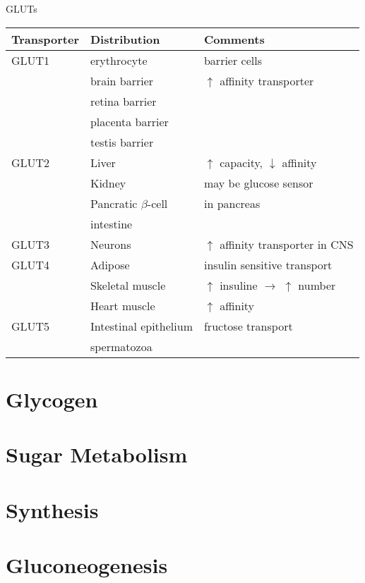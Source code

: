 \documentclass[presentation, smaller]{beamer}
\begin{document}
\begin{frame}[label={sec:orgdf508cc}]{GLUTs}
\begin{center}
\begin{tabular}{lll}
Transporter & Distribution & Comments\\
\hline
GLUT1 & erythrocyte & barrier cells\\
 & brain barrier & \(\uparrow\) affinity transporter\\
 & retina barrier & \\
 & placenta barrier & \\
 & testis barrier & \\
\hline
GLUT2 & Liver & \(\uparrow\) capacity, \(\downarrow\) affinity\\
 & Kidney & may be glucose sensor\\
 & Pancratic \(\beta\)-cell & in pancreas\\
 & intestine & \\
\hline
GLUT3 & Neurons & \(\uparrow\) affinity  transporter in CNS\\
\hline
GLUT4 & Adipose & insulin sensitive transport\\
 & Skeletal muscle & \(\uparrow\) insuline \(\to\) \(\uparrow\) number\\
 & Heart muscle & \(\uparrow\) affinity\\
\hline
GLUT5 & Intestinal epithelium & fructose transport\\
 & spermatozoa & \\
\end{tabular}
\end{center}
\end{frame}

\section{Glycogen}
\label{sec:orgd6dcd1f}
\section{Sugar Metabolism}
\label{sec:org48dbe2d}
\section{Synthesis}
\label{sec:org9add830}
\section{Gluconeogenesis}
\label{sec:org82ebff2}
\end{document}
